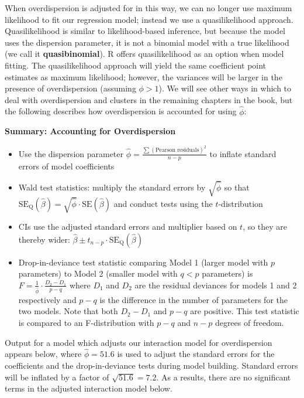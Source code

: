 \documentclass[
]{krantz}
\providecommand{\tightlist}{%
  \setlength{\itemsep}{0pt}\setlength{\parskip}{0pt}}
\begin{document}
When overdispersion is adjusted for in this way, we can no longer use maximum likelihood to fit our regression model; instead we use a quasilikelihood approach.  Quasilikelihood is similar to likelihood-based inference, but because the model uses the dispersion parameter, it is not a binomial model with a true likelihood (we call it \textbf{quasibinomial}).  R offers quasilikelihood as an option when model fitting. The quasilikelihood approach will yield the same coefficient point estimates as maximum likelihood; however, the variances will be larger in the presence of overdispersion (assuming \(\phi>1\)). We will see other ways in which to deal with overdispersion and clusters in the remaining chapters in the book, but the following describes how overdispersion is accounted for using \(\hat{\phi}\):
\vspace{5mm}

\textbf{Summary: Accounting for Overdispersion}

\begin{itemize}
\tightlist
\item
  Use the dispersion parameter \(\hat\phi=\frac{\sum(\textrm{Pearson residuals})^2}{n-p}\) to inflate standard errors of model coefficients
\item
  Wald test statistics: multiply the standard errors by \(\sqrt{\hat{\phi}}\) so that \(\textrm{SE}_\textrm{Q}(\hat\beta)=\sqrt{\hat\phi}\cdot\textrm{SE}(\hat\beta)\) and conduct tests using the \(t\)-distribution
\item
  CIs use the adjusted standard errors and multiplier based on \(t\), so they are thereby wider: \(\hat\beta \pm t_{n-p} \cdot \textrm{SE}_\textrm{Q}(\hat\beta)\)
\item
  Drop-in-deviance test statistic comparing Model 1 (larger model with \(p\) parameters) to Model 2 (smaller model with \(q<p\) parameters) is \(F = \frac{1}{\hat\phi} \cdot \frac{D_2 - D_1}{p-q}\) where \(D_1\) and \(D_2\) are the residual deviances for models 1 and 2 respectively and \(p-q\) is the difference in the number of parameters for the two models. Note that both \(D_2-D_1\) and \(p-q\) are positive. This test statistic is compared to an F-distribution with \(p-q\) and \(n-p\) degrees of freedom.
\end{itemize}

Output for a model which adjusts our interaction model for overdispersion appears below, where \(\hat{\phi}=51.6\) is used to adjust the standard errors for the coefficients and the drop-in-deviance tests during model building. Standard errors will be inflated by a factor of \(\sqrt{51.6}=7.2\). As a results, there are no significant terms in the adjusted interaction model below.
\end{document}
